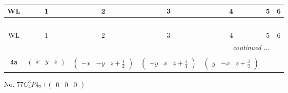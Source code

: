 \documentclass[fleqn,9pt,landscape]{jsarticle}
\begin{document}
\begin{center}
\renewcommand{\arraystretch}{1.2}
\begin{longtable}{ccccccc}
 \hline \hline
WL & 1 & 2 & 3 & 4 & 5 & 6 \\ \hline \endfirsthead

\multicolumn{6}{l}{\tablename\ \thetable{}} \\
 \hline \hline
WL & 1 & 2 & 3 & 4 & 5 & 6 \\ \hline \endhead

 \hline \hline
\multicolumn{6}{r}{\footnotesize\it continued ...} \\ \endfoot

 \hline \hline
\multicolumn{6}{r}{} \\ \endlastfoot

{\tt 4a} & $ \begin{pmatrix} x & y & z \end{pmatrix} $ & $ \begin{pmatrix} - x & - y & z + \frac{1}{2} \end{pmatrix} $ & $ \begin{pmatrix} - y & x & z + \frac{1}{4} \end{pmatrix} $ & $ \begin{pmatrix} y & - x & z + \frac{3}{4} \end{pmatrix} $ \\
\end{longtable}
\end{center}
\newpage
No. 77\quad$C_{4}^{3}$\quad$P4_2$\quad[ tetragonal ]\quad$+\begin{pmatrix} 0 & 0 & 0 \end{pmatrix}$
\end{document}
